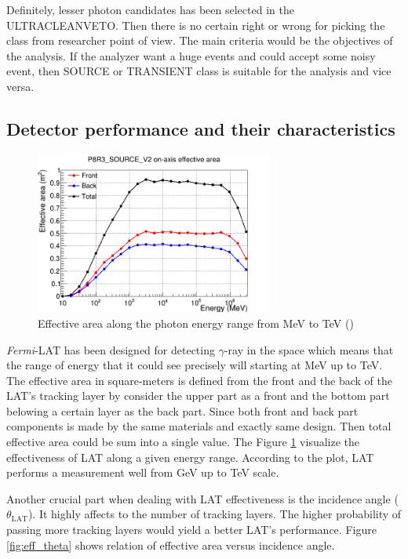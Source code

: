 Definitely, lesser photon candidates has been selected in 
the ULTRACLEANVETO. Then there is no certain right or wrong for
picking the class from researcher point of view. The main criteria 
would be the objectives of the analysis. If the analyzer want a 
huge events and could accept some noisy event, then SOURCE or 
TRANSIENT class is suitable for the analysis and vice versa.


\subsection{Detector performance and their characteristics}

\begin{figure}[h!]
    \centering
    \includegraphics[width=0.7\textwidth]{content/background/figures/eff_energy.png}
    \caption{
        Effective area along the photon energy range from MeV to TeV
        (\cite{lat_p8_performance})
    }
    \label{fig:eff_energy}
\end{figure}

\textit{Fermi}-LAT has been designed for detecting $\gamma$-ray in the 
space which means that the range of energy that it could see precisely 
will starting at MeV up to TeV. The effective area in square-meters
is defined from the front and the back of the LAT's tracking layer 
by consider the upper part as a front and the bottom part belowing 
a certain layer as the back part. Since both front and back part 
components is made by the same materials and exactly same design. 
Then total effective area could be sum into a single value. 
The Figure \ref{fig:eff_energy} visualize the effectiveness of LAT 
along a given energy range. According to the plot, LAT performs 
a measurement well from GeV up to TeV scale.


Another crucial part when dealing with LAT effectiveness is the 
incidence angle ($\theta_\text{LAT}$). It highly affects to the 
number of tracking layers. The higher probability of passing more 
tracking layers would yield a better LAT's performance. Figure 
\ref{fig:eff_theta} shows relation of effective area versus 
incidence angle.


